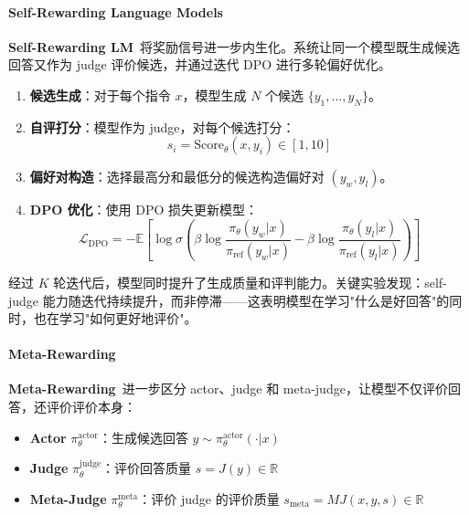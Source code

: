 \paragraph{Self-Rewarding Language Models}

\textbf{Self-Rewarding LM}~\citep{selfrewarding2024}将奖励信号进一步内生化。系统让同一个模型既生成候选回答又作为 judge 评价候选，并通过迭代 DPO 进行多轮偏好优化。

\begin{enumerate}
\item \textbf{候选生成}：对于每个指令 $x$，模型生成 $N$ 个候选 $\{y_1, \ldots, y_N\}$。

\item \textbf{自评打分}：模型作为 judge，对每个候选打分：
\begin{equation}
s_i = \mathrm{Score}_\theta(x, y_i) \in [1, 10]
\label{eq:selfreward-score}
\end{equation}

\item \textbf{偏好对构造}：选择最高分和最低分的候选构造偏好对 $(y_w, y_l)$。

\item \textbf{DPO 优化}：使用 DPO 损失更新模型：
\begin{equation}
\mathcal{L}_{\mathrm{DPO}} = -\mathbb{E}\left[\log \sigma\left(\beta \log \frac{\pi_\theta(y_w|x)}{\pi_{\mathrm{ref}}(y_w|x)} - \beta \log \frac{\pi_\theta(y_l|x)}{\pi_{\mathrm{ref}}(y_l|x)}\right)\right]
\label{eq:selfreward-dpo}
\end{equation}
\end{enumerate}

经过 $K$ 轮迭代后，模型同时提升了生成质量和评判能力。关键实验发现：self-judge 能力随迭代持续提升，而非停滞——这表明模型在学习"什么是好回答"的同时，也在学习"如何更好地评价"。

\paragraph{Meta-Rewarding}

\textbf{Meta-Rewarding}~\citep{metarewarding2024}进一步区分 actor、judge 和 meta-judge，让模型不仅评价回答，还评价评价本身：

\begin{itemize}
\item \textbf{Actor} $\pi_\theta^{\mathrm{actor}}$：生成候选回答 $y \sim \pi_\theta^{\mathrm{actor}}(\cdot | x)$
\item \textbf{Judge} $\pi_\theta^{\mathrm{judge}}$：评价回答质量 $s = J(y) \in \mathbb{R}$
\item \textbf{Meta-Judge} $\pi_\theta^{\mathrm{meta}}$：评价 judge 的评价质量 $s_{\mathrm{meta}} = MJ(x, y, s) \in \mathbb{R}$
\end{itemize}

